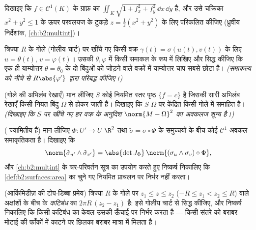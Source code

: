 \begin{exercise}[$\star\star$]\label{exo:b2:surfaces:5}
दिखाइए कि $f \in \mathcal{C}^1(K)$ के ग्राफ़ का  $\iint_K \sqrt{1 + f_x^2 + f_y^2}\,\dd x\,\dd y$ है, और उसे चक्रिका
$x^2 + y^2 \leq 1$ के ऊपर परवलयज के टुकड़े $z = \frac12(x^2 + y^2)$ के लिए परिकलित कीजिए (ध्रुवीय
निर्देशांक, \cref{ch:b2:multint})।
\end{exercise}

\begin{exercise}[$\star\star$]\label{exo:b2:surfaces:6}
त्रिज्या $R$ के गोले (गोलीय चार्ट) पर खींचे गए किसी वक्र
$\gamma(t) = \sigma(u(t), v(t))$ के लिए $u = \theta(t)$, $v =
\varphi(t)$। उसकी  $\theta, \varphi$ में किसी समाकल के रूप में
लिखिए और सिद्ध कीजिए कि एक ही याम्योत्तर $\theta = \theta_0$ के दो बिंदुओं को
जोड़ने वाले वक्रों में याम्योत्तर चाप सबसे छोटा है।
\emph{(समाकल्य को नीचे से $R\abs{\varphi'}$ द्वारा परिबद्ध कीजिए।)}
\end{exercise}

\begin{exercise}[$\star\star\star$]\label{exo:b2:surfaces:7}
(गोले की अभिलंब रेखाएँ) मान लीजिए $S$ कोई  नियमित स्तर
पृष्ठ $\{f = c\}$ है जिसकी सारी अभिलंब रेखाएँ किसी नियत बिंदु $\Omega$ से
होकर जाती हैं। दिखाइए कि $S$ $\Omega$ पर केंद्रित किसी गोले में
समाहित है। \emph{(दिखाइए कि $S$ पर खींचे गए हर वक्र के अनुदिश $\norm{M - \Omega}^2$
का अवकलज शून्य है।)}
\end{exercise}

\begin{exercise}[$\star\star\star$]\label{exo:b2:surfaces:8}
( ज्यामितीय है) मान लीजिए $\Phi \colon U' \to U$ $\R^2$ तथा $\tilde\sigma =
\sigma \circ \Phi$ के 
समुच्चयों के बीच कोई $\mathcal{C}^1$ अवकल समाकृतिकता है। दिखाइए कि
\[
\norm{\tilde\sigma_{u'} \wedge \tilde\sigma_{v'}}
= \abs{\det J_\Phi}\,
\norm{(\sigma_u \wedge \sigma_v)\circ\Phi} ,
\]
और \cref{ch:b2:multint} के चर-परिवर्तन सूत्र का उपयोग करते हुए निष्कर्ष निकालिए कि
\cref{def:b2:surfaces:area} का  चुने गए नियमित प्राचलन पर निर्भर नहीं करता।
\end{exercise}

\begin{exercise}[$\star$]\label{exo:b2:surfaces:9}
(आर्किमिडीज़ की टोप-डिब्बा प्रमेय) त्रिज्या $R$ के गोले पर
$z_1 \leq z \leq z_2$ ($-R \leq z_1 < z_2 \leq R$) वाले अक्षांशों के बीच के \emph{कटिबंध} का 
$2\pi R\,(z_2 - z_1)$ है: इसे गोलीय चार्ट से सिद्ध कीजिए, और निष्कर्ष निकालिए कि
किसी कटिबंध का  केवल उसकी ऊँचाई पर निर्भर करता है ---
किसी संतरे को बराबर मोटाई की फाँकों में काटने पर छिलका बराबर मात्रा
में मिलता है।
\end{exercise}


